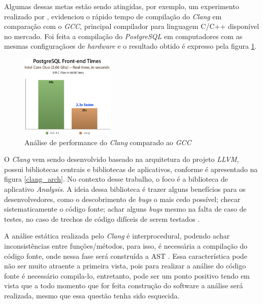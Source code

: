 Algumas dessas metas estão sendo atingidas, por exemplo, um experimento
realizado por , evidenciou o rápido
tempo de compilação do \emph{Clang} em comparação com o \emph{GCC}, principal
compilador para linguagem C/C++ disponível no mercado. Foi feita a compilação do \textit{PostgreSQL} em computadores com as
mesmas configuraçãoes de \textit{hardware} e o resultado obtido é expresso pela figura \ref{clang_gcc}.

\begin{figure}[h]
  \centering
  \includegraphics[width=0.4\textwidth]
      {figuras/clang_gcc.eps}
      \caption{Análise de performance do \emph{Clang} comparado ao
      \emph{GCC} \cite{naroff2009}}
  \label{clang_gcc}
\end{figure}

O \emph{Clang} vem sendo desenvolvido baseado na arquitetura do projeto
\emph{LLVM}, possui bibliotecas centrais e bibliotecas de 
aplicativos, conforme é apresentado na figura \ref{clang_arch}. No contexto desse trabalho, o foco é a biblioteca de aplicativo
\textit{Analysis}. A ideia dessa biblioteca é trazer alguns benefícios para os desenvolvedores, como o descobrimento de 
\textit{bugs} o mais cedo possível; checar sistematicamente o código fonte; achar alguns \textit{bugs} mesmo na falta de caso
de testes, no caso de trechos de código difíceis de serem testados \cite{kremenek2009}. 

A análise estática realizada pelo \emph{Clang} é interprocedural, podendo achar inconsistências entre funções/métodos, para isso,
é necessária a compilação do código fonte, onde nessa fase será construída a AST 
\cite{kremenek2009}. Essa característica pode não ser muito atraente a primeira vista, pois para realizar a análise do código 
fonte é necessário compila-lo, entretanto, pode ser um ponto positivo tendo em vista que a todo momento que for feita 
construção do software a análise será realizada, mesmo que essa questão tenha sido esquecida.

